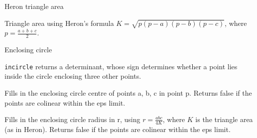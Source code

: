 \begin{algorithm}{Heron triangle area}

\desc
Triangle area using Heron's formula
$K=\sqrt{p(p-a)(p-b)(p-c)}$, where $p=\frac{a+b+c}{2}$.
\end{algorithm}

\begin{algorithm}{Enclosing circle}

\desc
{\tt incircle} returns a determinant, whose sign determines whether a point
lies inside the circle enclosing three other points.


\desc
Fills in the enclosing circle centre of points a, b, c in point p.
Returns false if the points are colinear within the eps limit.

\desc
Fills in the enclosing circle radius in r, using $r=\frac{abc}{4K}$,
where $K$ is the triangle area (as in Heron).
Returns false if the points are colinear within the eps limit.
\end{algorithm}
